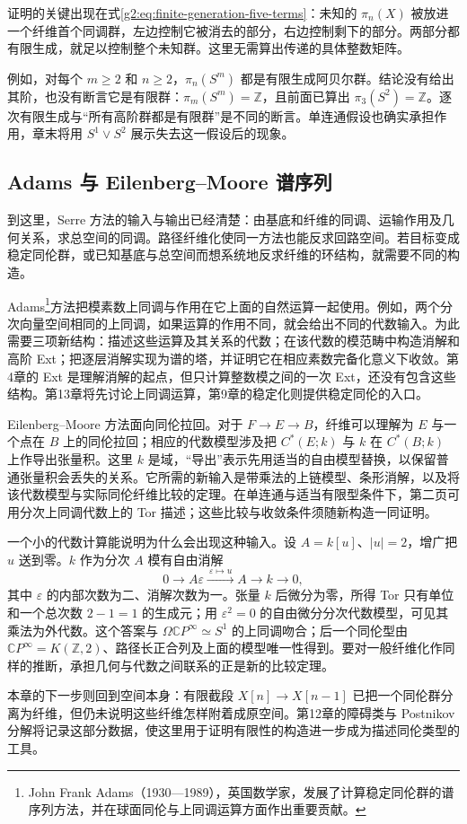 证明的关键出现在式\eqref{g2:eq:finite-generation-five-terms}：未知的 \(\pi_n(X)\) 被放进一个纤维首个同调群，左边控制它被消去的部分，右边控制剩下的部分。两部分都有限生成，就足以控制整个未知群。这里无需算出传递的具体整数矩阵。

\ProseParagraphBreak

例如，对每个 \(m\ge2\) 和 \(n\ge2\)，\(\pi_n(S^m)\) 都是有限生成阿贝尔群。结论没有给出其阶，也没有断言它是有限群：\(\pi_m(S^m)=\mathbb Z\)，且前面已算出 \(\pi_3(S^2)=\mathbb Z\)。逐次有限生成与“所有高阶群都是有限群”是不同的断言。单连通假设也确实承担作用，章末将用 \(S^1\vee S^2\) 展示失去这一假设后的现象。

\subsection{Adams 与 Eilenberg–Moore 谱序列}
\label{g2:subsec:1105:03}

到这里，Serre 方法的输入与输出已经清楚：由基底和纤维的同调、运输作用及几何关系，求总空间的同调。路径纤维化使同一方法也能反求回路空间。若目标变成稳定同伦群，或已知基底与总空间而想系统地反求纤维的环结构，就需要不同的构造。

\ProseParagraphBreak

Adams\footnote{John Frank Adams（1930—1989），英国数学家，发展了计算稳定同伦群的谱序列方法，并在球面同伦与上同调运算方面作出重要贡献。}方法把模素数上同调与作用在它上面的自然运算一起使用。例如，两个分次向量空间相同的上同调，如果运算的作用不同，就会给出不同的代数输入。为此需要三项新结构：描述这些运算及其关系的代数；在该代数的模范畴中构造消解和高阶 Ext；把逐层消解实现为谱的塔，并证明它在相应素数完备化意义下收敛。第4章的 Ext 是理解消解的起点，但只计算整数模之间的一次 Ext，还没有包含这些结构。第13章将先讨论上同调运算，第9章的稳定化则提供稳定同伦的入口。

\ProseParagraphBreak

Eilenberg–Moore 方法面向同伦拉回。对于 \(F\to E\to B\)，纤维可以理解为 \(E\) 与一个点在 \(B\) 上的同伦拉回；相应的代数模型涉及把 \(C^*(E;k)\) 与 \(k\) 在 \(C^*(B;k)\) 上作导出张量积。这里 \(k\) 是域，“导出”表示先用适当的自由模型替换，以保留普通张量积会丢失的关系。它所需的新输入是带乘法的上链模型、条形消解，以及将该代数模型与实际同伦纤维比较的定理。在单连通与适当有限型条件下，第二页可用分次上同调代数上的 Tor 描述；这些比较与收敛条件须随新构造一同证明。

\ProseParagraphBreak

一个小的代数计算能说明为什么会出现这种输入。设 \(A=k[u]\)、\(|u|=2\)，增广把 \(u\) 送到零。\(k\) 作为分次 \(A\) 模有自由消解
\[
	0\longrightarrow A\varepsilon\xrightarrow{\ \varepsilon\mapsto u\ }A\longrightarrow k\longrightarrow0,
\]
其中 \(\varepsilon\) 的内部次数为二、消解次数为一。张量 \(k\) 后微分为零，所得 Tor 只有单位和一个总次数 \(2-1=1\) 的生成元；用 \(\varepsilon^2=0\) 的自由微分分次代数模型，可见其乘法为外代数。这个答案与 \(\Omega\mathbb CP^\infty\simeq S^1\) 的上同调吻合；后一个同伦型由 \(\mathbb CP^\infty=K(\mathbb Z,2)\)、路径长正合列及上面的模型唯一性得到。要对一般纤维化作同样的推断，承担几何与代数之间联系的正是新的比较定理。

\ProseParagraphBreak

本章的下一步则回到空间本身：有限截段 \(X[n]\to X[n-1]\) 已把一个同伦群分离为纤维，但仍未说明这些纤维怎样附着成原空间。第12章的障碍类与 Postnikov 分解将记录这部分数据，使这里用于证明有限性的构造进一步成为描述同伦类型的工具。
